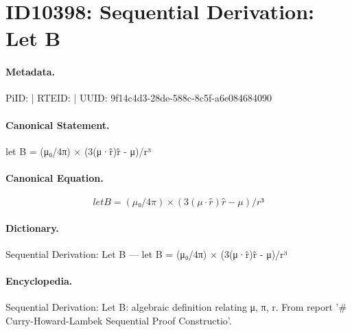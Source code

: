 \section*{ID10398: Sequential Derivation: Let B}
\paragraph{Metadata.}
PiID:  | RTEID:  | UUID: 9f14c4d3-28de-588c-8c5f-a6e084684090

\paragraph{Canonical Statement.}
let B = (μ₀/4π) × (3(μ·r̂)r̂ - μ)/r³

\paragraph{Canonical Equation.}
\[
let B = (μ₀/4π) × (3(μ·r̂)r̂ - μ)/r³
\]

\paragraph{Dictionary.}
Sequential Derivation: Let B — let B = (μ₀/4π) × (3(μ·r̂)r̂ - μ)/r³

\paragraph{Encyclopedia.}
Sequential Derivation: Let B: algebraic definition relating μ, π, r. From report '\# Curry-Howard-Lambek Sequential Proof Constructio'.
